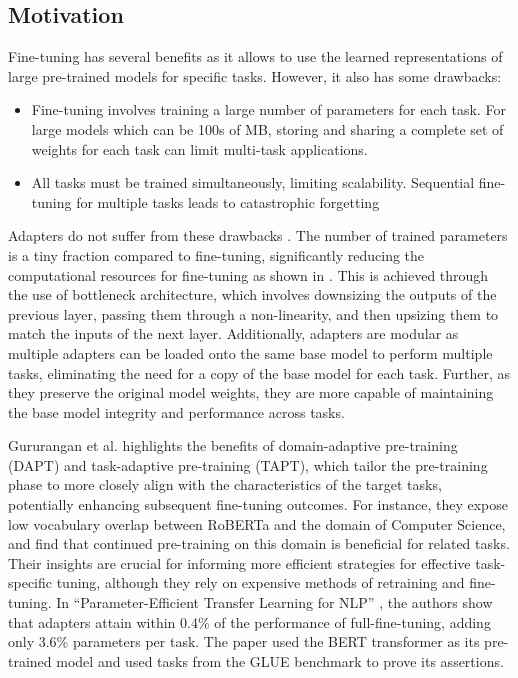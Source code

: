 \documentclass[10pt,twocolumn,letterpaper]{article}
\begin{document}
\subsection{Motivation}  
\label{sec.motivation}
Fine-tuning has several benefits as it allows to use the learned representations of large pre-trained models for specific tasks. However, it also has some drawbacks:

\begin{itemize}
    \item Fine-tuning involves training a large number of parameters for each task. For large models which can be 100s of MB, storing and sharing a complete set of weights for each task can limit multi-task applications.
    \item All tasks must be trained simultaneously, limiting scalability. Sequential fine-tuning for multiple tasks leads to catastrophic forgetting \cite{mccloskey1989catastrophic}
\end{itemize}
Adapters do not suffer from these drawbacks \cite{houlsby2019parameter}. The number of trained parameters is a tiny fraction compared to fine-tuning, significantly reducing the computational resources for fine-tuning as shown in . This is achieved through the use of bottleneck architecture, which involves downsizing the outputs of the previous layer, passing them through a non-linearity, and then upsizing them to match the inputs of the next layer. Additionally, adapters are modular as multiple adapters can be loaded onto the same base model to perform multiple tasks, eliminating the need for a copy of the base model for each task. Further, as they preserve the original model weights, they are more capable of maintaining the base model integrity and performance across tasks.

Gururangan et al. \cite{gururangan2020dont} highlights the benefits of domain-adaptive pre-training (DAPT) and task-adaptive pre-training (TAPT), which tailor the pre-training phase to more closely align with the characteristics of the target tasks, potentially enhancing subsequent fine-tuning outcomes. For instance, they expose low vocabulary overlap between RoBERTa and the domain of Computer Science, and find that continued pre-training on this domain is beneficial for related tasks. Their insights are crucial for informing more efficient strategies for effective task-specific tuning, although they rely on expensive methods of retraining and fine-tuning. In “Parameter-Efficient Transfer Learning for NLP” \cite{houlsby2019parameter}, the authors show that adapters attain within 0.4\% of the performance of full-fine-tuning, adding only 3.6\% parameters per task. The paper used the BERT transformer as its pre-trained model and used tasks from the GLUE benchmark to prove its assertions. 
\end{document}
